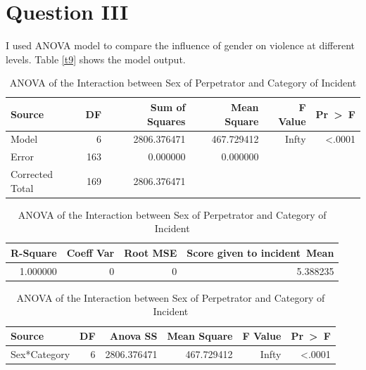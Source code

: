 \section*{Question III}

I used ANOVA model to compare the influence of gender on violence at different levels. Table \ref{t9} shows the model output.

\begin{table}[H]
\centering
\begin{longtable}{lrrrrr}
\toprule
   Source &    DF &    Sum of Squares &    Mean Square &    F Value &    Pr~>~F\\
\endhead
\midrule
   Model &    6 &    2806.376471 &    467.729412 &    Infty &    <.0001\\
   Error &    163 &    0.000000 &    0.000000 &      &     \\
   Corrected Total &    169 &    2806.376471 &      &      &     \\
\bottomrule
\end{longtable}

\begin{longtable}{rrrr}
\toprule
   R-Square &    Coeff Var &    Root MSE &    Score given to incident~Mean\\
\endhead
\midrule
   1.000000 &    0 &    0 &    5.388235\\
\bottomrule
\end{longtable}

\begin{longtable}{lrrrrr}
\toprule
   Source &    DF &    Anova SS &    Mean Square &    F Value &    Pr~>~F\\
\endhead
\midrule
   Sex*Category &    6 &    2806.376471 &    467.729412 &    Infty &    <.0001\\
\bottomrule
\end{longtable}

\caption{ANOVA of the Interaction between Sex of Perpetrator and Category of Incident}
\label{t6}
\end{table}

